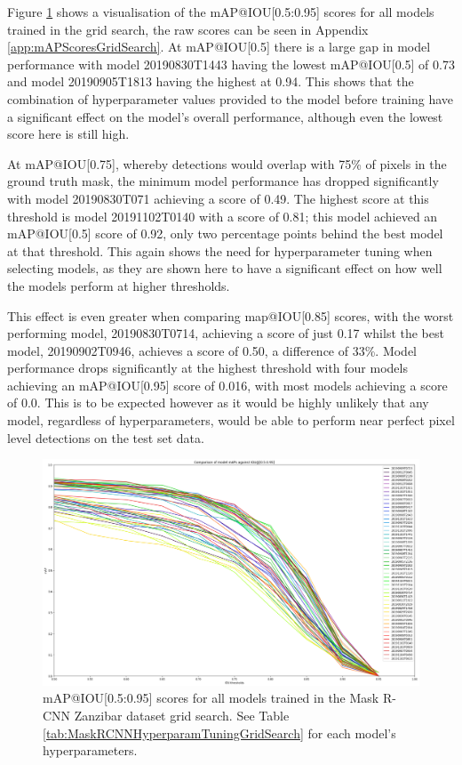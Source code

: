 Figure \ref{fig:mAP-graph} shows a visualisation of the mAP@IOU[0.5:0.95] scores for all models trained in the grid search, the raw scores can be seen in Appendix \ref{app:mAPScoresGridSearch}. At mAP@IOU[0.5] there is a large gap in model performance with model 20190830T1443 having the lowest mAP@IOU[0.5] of 0.73 and model 20190905T1813 having the highest at 0.94. This shows that the combination of hyperparameter values provided to the model before training have a significant effect on the model's overall performance, although even the lowest score here is still high. 

At mAP@IOU[0.75], whereby detections would overlap with 75\% of pixels in the ground truth mask, the minimum model performance has dropped significantly with model 20190830T071 achieving a score of 0.49. The highest score at this threshold is model 20191102T0140 with a score of 0.81; this model achieved an mAP@IOU[0.5] score of 0.92, only two percentage points behind the best model at that threshold. This again shows the need for hyperparameter tuning when selecting models, as they are shown here to have a significant effect on how well the models perform at higher thresholds.

This effect is even greater when comparing map@IOU[0.85] scores, with the worst performing model, 20190830T0714,  achieving a score of just 0.17 whilst the best model, 20190902T0946, achieves a score of 0.50, a difference of 33\%. Model performance drops significantly at the highest threshold with four models achieving an mAP@IOU[0.95] score of 0.016, with most models achieving a score of 0.0. This is to be expected however as it would be highly unlikely that any model, regardless of hyperparameters, would be able to perform near perfect pixel level detections on the test set data. 

\begin{figure}[h]
	\begin{center}
		\includegraphics[scale=0.3]{Chapter3/figs/comparison_graph_all_diff_colours.png}
	\end{center}
	\caption[mAP@IOU{[0.5:0.95]} scores for all models trained in the Mask R-CNN Zanzibar dataset grid search.]{mAP@IOU[0.5:0.95] scores for all models trained in the Mask R-CNN Zanzibar dataset grid search. See Table \ref{tab:MaskRCNNHyperparamTuningGridSearch} for each model's hyperparameters.}
	\label{fig:mAP-graph}
\end{figure}


